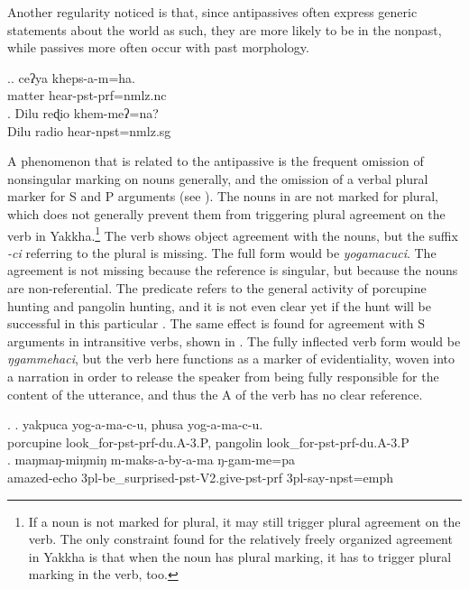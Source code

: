 Another regularity noticed is that, since antipassives often express generic statements about the world as such, they are more likely to be in the nonpast, while passives more often occur with past morphology.

\ex.\ag. ceʔya kheps-a-m=ha.\\
matter hear{\sc [3sg]-pst-prf=nmlz.nc}\\
 
\bg. Dilu  reɖio khem-meʔ=na?\\
Dilu radio  hear{\sc [3sg]-npst=nmlz.sg}\\


A  phenomenon that is related to the antipassive  is the frequent omission of nonsingular marking on nouns generally, and the omission of a verbal plural marker for S and P arguments (see ). The nouns in \Next[a] are not marked for plural, which does  not generally prevent them from triggering plural agreement on the verb in Yakkha.\footnote{If a noun is not marked for plural, it may still trigger plural agreement on the verb. The only constraint found for the relatively freely organized agreement in Yakkha is that when the noun has plural marking, it has to trigger plural marking in the verb, too.} The verb shows object agreement with the nouns, but the suffix \emph{-ci} referring to the plural  is missing. The full form would be  \emph{yogamacuci}. The agreement is not missing because the reference is singular, but because the nouns are non-referential. The predicate refers to the general activity of porcupine hunting and pangolin hunting, and it is not even clear yet if the hunt will be successful in this particular . The same effect is found for agreement with S arguments in intransitive verbs, shown in \Next[b]. The fully inflected verb form would be \emph{ŋgammehaci}, but the verb here functions as a marker of evidentiality, woven into a narration in order to release the speaker from being fully responsible for the content of the utterance, and thus the A of the verb has no clear reference.


\ex. \ag. yakpuca   yog-a-ma-c-u, phusa    yog-a-ma-c-u.\\
porcupine   look\_for{\sc -pst-prf-du.A-3.P}, pangolin   look\_for{\sc -pst-prf-du.A-3.P}\\
 
\bg. maŋmaŋ-miŋmiŋ m-maks-a-by-a-ma ŋ-gam-me=pa\\
	amazed{\sc -echo} {\sc 3pl-}be\_surprised{\sc -pst-V2.give-pst-prf} {\sc 3pl-}say{\sc -npst=emph}\\
	 
	


